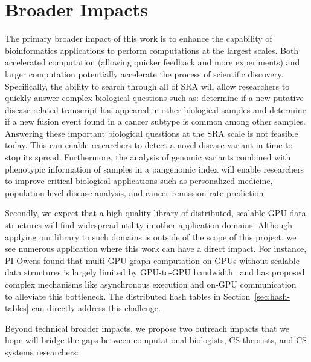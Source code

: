 \section{Broader Impacts}
\label{broadimpacts}

The primary broader impact of this work is to enhance the capability of bioinformatics applications to perform computations at the largest scales. Both accelerated computation (allowing quicker feedback and more experiments) and larger computation potentially accelerate the process of scientific discovery. 
%
Specifically, the ability to search through all of SRA will allow researchers to quickly answer complex biological questions such as: determine if a new putative disease-related transcript has appeared in other biological samples and determine if a new fusion event found in a cancer subtype is common among other samples. Answering these important biological questions at the SRA scale is not feasible today. This can enable researchers to detect a novel disease variant in time to stop its spread.
% 
Furthermore, the analysis of genomic variants combined with phenotypic information of samples in a pangenomic index will enable researchers to improve critical biological applications such as personalized medicine, population-level disease analysis, and cancer remission rate prediction.


Secondly, we expect that a high-quality library of distributed, scalable GPU data structures will find widespread utility in other application domains. Although applying our library to such domains is outside of the scope of this project, we see numerous application where this work can have a direct impact. For instance, PI Owens found that multi-GPU graph computation on GPUs without scalable data structures is largely limited by GPU-to-GPU bandwidth~\cite{Pan:2017:MGA} and has proposed complex mechanisms like asynchronous execution and on-GPU communication~\cite{Chen:2022:SIP} to alleviate this bottleneck. The distributed hash tables in Section~\ref{sec:hash-tables} can directly address this challenge.

Beyond technical broader impacts, we propose two outreach impacts that we hope will bridge the gaps between computational biologists, CS theorists, and CS systems researchers:

